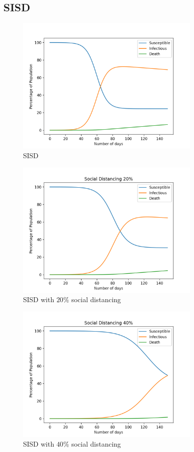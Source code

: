 \documentclass{article}
\begin{document}
	\subsection{SISD}
	\begin{figure}[h!]
		\centering
		\includegraphics[width=90mm]{images/SISD/standard.png}
		\caption{SISD}
	\end{figure}
	\begin{figure}[h!]
		\centering
		\includegraphics[width=90mm]{images/SISD/social_distance_20.png}
		\caption{SISD with $20\%$ social distancing}
	\end{figure}
	\clearpage
	\begin{figure}[h!]
		\centering
		\includegraphics[width=90mm]{images/SISD/social_distance_40.png}
		\caption{SISD with $40\%$ social distancing}
	\end{figure}
\end{document}
